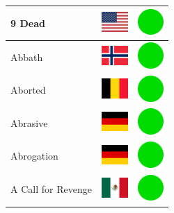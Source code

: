 \documentclass[12pt, a4paper, twoside]{report}
\begin{document}
\begin{center}
\begin{longtable}{|p{5cm}|p{2cm}|p{2cm}|}
 9 Dead                                                     & \includegraphics[width=1cm]{../img/flags/us} &   \includegraphics[width=1cm]{../likes/y} \\ \hline
 Abbath                                                     & \includegraphics[width=1cm]{../img/flags/no} &   \includegraphics[width=1cm]{../likes/y} \\ \hline
 Aborted                                                    & \includegraphics[width=1cm]{../img/flags/be} &   \includegraphics[width=1cm]{../likes/y} \\ \hline
 Abrasive                                                   & \includegraphics[width=1cm]{../img/flags/de} &   \includegraphics[width=1cm]{../likes/y} \\ \hline
 Abrogation                                                 & \includegraphics[width=1cm]{../img/flags/de} &   \includegraphics[width=1cm]{../likes/y} \\ \hline
 A Call for Revenge                                         & \includegraphics[width=1cm]{../img/flags/mx} &   \includegraphics[width=1cm]{../likes/y} \\ \hline

\end{longtable}
\end{center}
\end{document}
